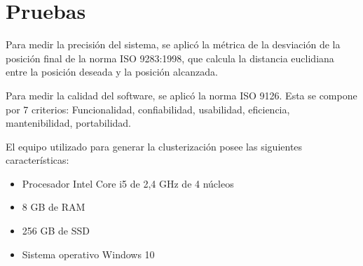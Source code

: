 \section{Pruebas}

Para medir la precisión del sistema, se aplicó la métrica de la desviación de la posición final de la norma ISO 9283:1998, que calcula la distancia euclidiana entre la posición deseada y la posición alcanzada.

Para medir la calidad del software, se aplicó la norma ISO 9126. Esta se compone por 7 criterios: Funcionalidad, confiabilidad, usabilidad, eficiencia, mantenibilidad, portabilidad. 

El equipo utilizado para generar la clusterización posee las siguientes características:

\begin{itemize}
	\item Procesador Intel Core i5 de 2,4 GHz de 4 núcleos
	\item 8 GB de RAM
	\item 256 GB de SSD
	\item Sistema operativo Windows 10
\end{itemize}